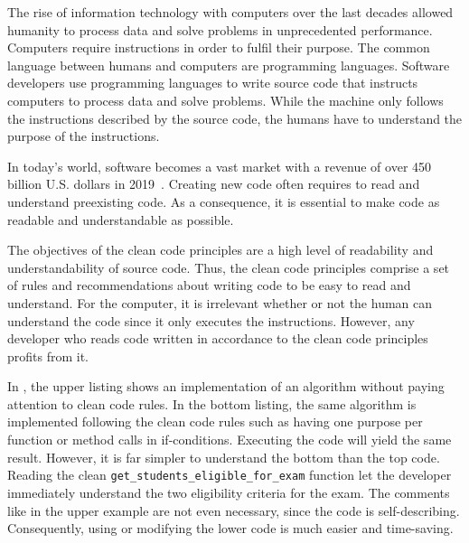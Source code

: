 The rise of information technology with computers over the last decades allowed humanity to process data and solve problems in unprecedented performance. Computers require instructions in order to fulfil their purpose. The common language between humans and computers are programming languages. Software developers use programming languages to write source code that instructs computers to process data and solve problems. While the machine only follows the instructions described by the source code, the humans have to understand the purpose of the instructions. 

In today's world, software becomes a vast market with a revenue of over 450 billion U.S. dollars in 2019~\cite{statista_software_nodate,costello_gartner_2019}. Creating new code often requires to read and understand preexisting code. As a consequence, it is essential to make code as readable and understandable as possible. 

The objectives of the clean code principles are a high level of readability and understandability of source code. Thus, the clean code principles comprise a set of rules and recommendations about writing code to be easy to read and understand. For the computer, it is irrelevant whether or not the human can understand the code since it only executes the instructions. However, any developer who reads code written in accordance to the clean code principles profits from it. 

In , the upper listing shows an implementation of an algorithm without paying attention to clean code rules. In the bottom listing, the same algorithm is implemented following the clean code rules such as having one purpose per function or method calls in if-conditions. Executing the code will yield the same result. However, it is far simpler to understand the bottom than the top code. Reading the clean \texttt{get\_students\_eligible\_for\_exam} function let the developer immediately understand the two eligibility criteria for the exam. The comments like in the upper example are not even necessary, since the code is self-describing.
Consequently, using or modifying the lower code is much easier and time-saving.

